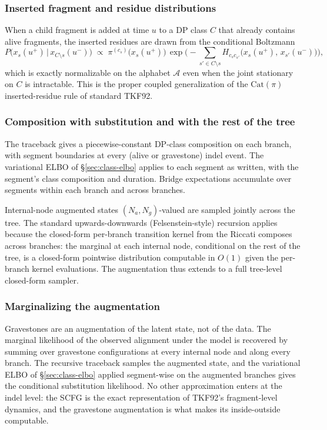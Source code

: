 \subsubsection*{Inserted fragment and residue distributions}

When a child fragment is added at time $u$ to a DP class $C$ that
already contains alive fragments, the inserted residues are drawn
from the conditional Boltzmann
\[
P\!\bigl(x_s(u^+) \,\big|\, x_{C \setminus s}(u^-)\bigr)
\;\propto\;
\pi^{(c_s)}\!\bigl(x_s(u^+)\bigr)\, \exp\!\Big(-\!\!\sum_{s' \in C \setminus s}\!\! H_{c_s c_{s'}}\!\bigl(x_s(u^+),\, x_{s'}(u^-)\bigr)\Big),
\]
which is exactly normalizable on the alphabet $\mathcal{A}$ even
when the joint stationary on $C$ is intractable. This is the proper
coupled generalization of the $\mathrm{Cat}(\pi)$ inserted-residue
rule of standard TKF92.

\subsubsection*{Composition with substitution and with the rest of
the tree}

The traceback gives a piecewise-constant DP-class composition on
each branch, with segment boundaries at every (alive or gravestone)
indel event. The variational ELBO of \S\ref{sec:class-elbo} applies
to each segment as written, with the segment's class composition
and duration. Bridge expectations accumulate over
segments within each branch and across branches.

Internal-node augmented states $(N_a, N_g)$-valued are sampled
jointly across the tree. The standard upwards-downwards
(Felsenstein-style) recursion applies because the closed-form
per-branch transition kernel from the Riccati composes across
branches: the marginal at each internal node, conditional on the
rest of the tree, is a closed-form pointwise distribution
computable in $O(1)$ given the per-branch kernel evaluations. The
augmentation thus extends to a full tree-level closed-form sampler.

\subsubsection*{Marginalizing the augmentation}

Gravestones are an augmentation of the latent state, not of the
data. The marginal likelihood of the observed alignment under the
model is recovered by summing over gravestone configurations at
every internal node and along every branch. The recursive traceback
samples the augmented state, and the variational ELBO of
\S\ref{sec:class-elbo} applied segment-wise on the augmented
branches gives the conditional substitution likelihood. No other
approximation enters at the indel level: the SCFG is the exact
representation of TKF92's fragment-level dynamics, and the
gravestone augmentation is what makes its inside-outside computable.

